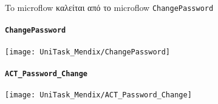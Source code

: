                     To microflow καλείται από το microflow \texttt{ChangePassword}

                \paragraph{\texttt{ChangePassword}}
                    \begin{center}
                        \texttt{[image: UniTask\_Mendix/ChangePassword]}
                    \end{center}

                \paragraph{\texttt{ACT\_Password\_Change}}
                    \begin{center}
                        \texttt{[image: UniTask\_Mendix/ACT\_Password\_Change]}
                    \end{center}